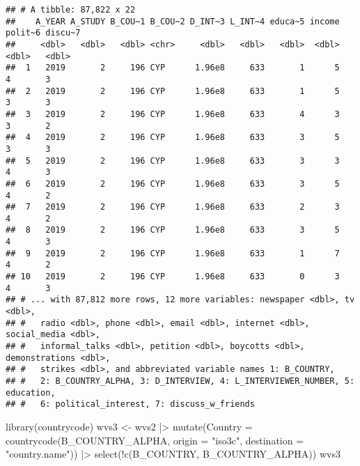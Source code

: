 \documentclass[
]{article}
\newenvironment{Shaded}{\begin{snugshade}}{\end{snugshade}}
\newcommand{\AttributeTok}[1]{\textcolor[rgb]{0.77,0.63,0.00}{#1}}
\newcommand{\FunctionTok}[1]{\textcolor[rgb]{0.00,0.00,0.00}{#1}}
\newcommand{\NormalTok}[1]{#1}
\newcommand{\OtherTok}[1]{\textcolor[rgb]{0.56,0.35,0.01}{#1}}
\newcommand{\SpecialCharTok}[1]{\textcolor[rgb]{0.00,0.00,0.00}{#1}}
\newcommand{\StringTok}[1]{\textcolor[rgb]{0.31,0.60,0.02}{#1}}
\begin{document}
\begin{verbatim}
## # A tibble: 87,822 x 22
##    A_YEAR A_STUDY B_COU~1 B_COU~2 D_INT~3 L_INT~4 educa~5 income polit~6 discu~7
##     <dbl>   <dbl>   <dbl> <chr>     <dbl>   <dbl>   <dbl>  <dbl>   <dbl>   <dbl>
##  1   2019       2     196 CYP      1.96e8     633       1      5       4       3
##  2   2019       2     196 CYP      1.96e8     633       1      5       3       3
##  3   2019       2     196 CYP      1.96e8     633       4      3       3       2
##  4   2019       2     196 CYP      1.96e8     633       3      5       3       3
##  5   2019       2     196 CYP      1.96e8     633       3      3       4       3
##  6   2019       2     196 CYP      1.96e8     633       3      5       4       2
##  7   2019       2     196 CYP      1.96e8     633       2      3       4       2
##  8   2019       2     196 CYP      1.96e8     633       3      5       4       3
##  9   2019       2     196 CYP      1.96e8     633       1      7       4       2
## 10   2019       2     196 CYP      1.96e8     633       0      3       4       3
## # ... with 87,812 more rows, 12 more variables: newspaper <dbl>, tv <dbl>,
## #   radio <dbl>, phone <dbl>, email <dbl>, internet <dbl>, social_media <dbl>,
## #   informal_talks <dbl>, petition <dbl>, boycotts <dbl>, demonstrations <dbl>,
## #   strikes <dbl>, and abbreviated variable names 1: B_COUNTRY,
## #   2: B_COUNTRY_ALPHA, 3: D_INTERVIEW, 4: L_INTERVIEWER_NUMBER, 5: education,
## #   6: political_interest, 7: discuss_w_friends
\end{verbatim}

\begin{Shaded}
\begin{Highlighting}[]
\FunctionTok{library}\NormalTok{(countrycode)}
\NormalTok{wvs3 }\OtherTok{\textless{}{-}}\NormalTok{ wvs2 }\SpecialCharTok{|\textgreater{}}
  \FunctionTok{mutate}\NormalTok{(}\AttributeTok{Country =} \FunctionTok{countrycode}\NormalTok{(B\_COUNTRY\_ALPHA, }\AttributeTok{origin =} \StringTok{"iso3c"}\NormalTok{, }\AttributeTok{destination =} \StringTok{"country.name"}\NormalTok{)) }\SpecialCharTok{|\textgreater{}}
  \FunctionTok{select}\NormalTok{(}\SpecialCharTok{!}\FunctionTok{c}\NormalTok{(B\_COUNTRY, B\_COUNTRY\_ALPHA))}
\NormalTok{wvs3}
\end{Highlighting}
\end{Shaded}
\end{document}
